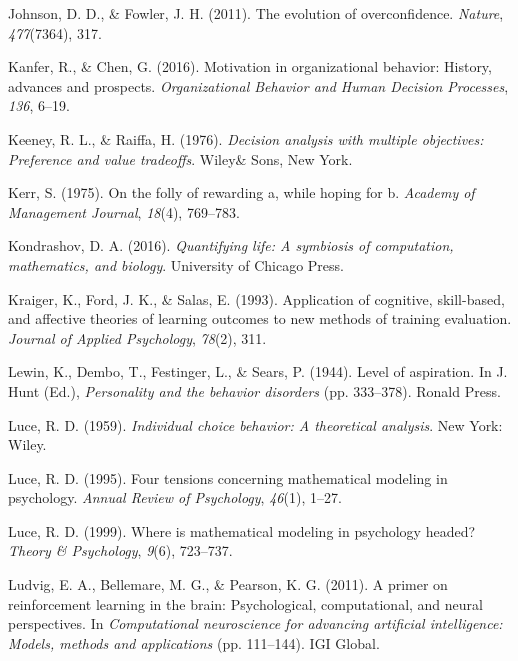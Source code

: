 \documentclass[english,,man]{apa6}
\theoremstyle{definition}
\theoremstyle{definition}
\theoremstyle{definition}
\theoremstyle{remark}
\begin{document}
\leavevmode\hypertarget{ref-johnson2011}{}%
Johnson, D. D., \& Fowler, J. H. (2011). The evolution of
overconfidence. \emph{Nature}, \emph{477}(7364), 317.

\leavevmode\hypertarget{ref-kanfer2016}{}%
Kanfer, R., \& Chen, G. (2016). Motivation in organizational behavior:
History, advances and prospects. \emph{Organizational Behavior and Human
Decision Processes}, \emph{136}, 6--19.

\leavevmode\hypertarget{ref-keeney1976}{}%
Keeney, R. L., \& Raiffa, H. (1976). \emph{Decision analysis with
multiple objectives: Preference and value tradeoffs}. Wiley\& Sons, New
York.

\leavevmode\hypertarget{ref-kerr1975}{}%
Kerr, S. (1975). On the folly of rewarding a, while hoping for b.
\emph{Academy of Management Journal}, \emph{18}(4), 769--783.

\leavevmode\hypertarget{ref-kondrashov2016}{}%
Kondrashov, D. A. (2016). \emph{Quantifying life: A symbiosis of
computation, mathematics, and biology}. University of Chicago Press.

\leavevmode\hypertarget{ref-kraiger1993}{}%
Kraiger, K., Ford, J. K., \& Salas, E. (1993). Application of cognitive,
skill-based, and affective theories of learning outcomes to new methods
of training evaluation. \emph{Journal of Applied Psychology},
\emph{78}(2), 311.

\leavevmode\hypertarget{ref-lewin1944}{}%
Lewin, K., Dembo, T., Festinger, L., \& Sears, P. (1944). Level of
aspiration. In J. Hunt (Ed.), \emph{Personality and the behavior
disorders} (pp. 333--378). Ronald Press.

\leavevmode\hypertarget{ref-luce1959}{}%
Luce, R. D. (1959). \emph{Individual choice behavior: A theoretical
analysis}. New York: Wiley.

\leavevmode\hypertarget{ref-luce1995}{}%
Luce, R. D. (1995). Four tensions concerning mathematical modeling in
psychology. \emph{Annual Review of Psychology}, \emph{46}(1), 1--27.

\leavevmode\hypertarget{ref-luce1999}{}%
Luce, R. D. (1999). Where is mathematical modeling in psychology headed?
\emph{Theory \& Psychology}, \emph{9}(6), 723--737.

\leavevmode\hypertarget{ref-ludvig2011}{}%
Ludvig, E. A., Bellemare, M. G., \& Pearson, K. G. (2011). A primer on
reinforcement learning in the brain: Psychological, computational, and
neural perspectives. In \emph{Computational neuroscience for advancing
artificial intelligence: Models, methods and applications} (pp.
111--144). IGI Global.
\end{document}

